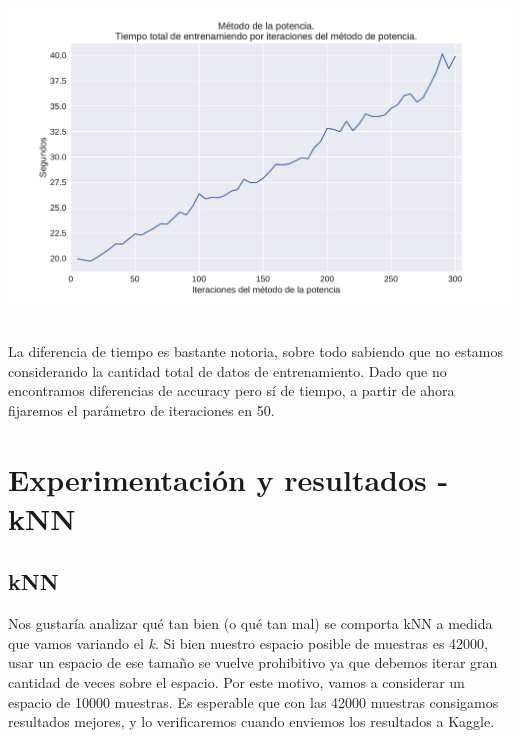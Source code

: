 {\centering
    \includegraphics[scale=0.55]{informe/imagenes/potencia/tiempoPorIters.pdf} \\
}
$ $\newline

La diferencia de tiempo es bastante notoria, sobre todo sabiendo que no estamos considerando la cantidad total de datos de entrenamiento. Dado que no encontramos diferencias de accuracy pero sí de tiempo, a partir de ahora fijaremos el parámetro de iteraciones en 50. \\

\section{Experimentación y resultados - kNN}

\subsection{kNN}


Nos gustaría analizar qué tan bien (o qué tan mal) se comporta kNN a medida que vamos variando el \textit{k}. Si bien nuestro espacio posible de muestras es 42000, usar un espacio de ese tamaño se vuelve prohibitivo ya que debemos iterar gran cantidad de veces sobre el espacio. Por este motivo, vamos a considerar un espacio de 10000 muestras. Es esperable que con las 42000 muestras consigamos resultados mejores, y lo verificaremos cuando enviemos los resultados a Kaggle. \\

